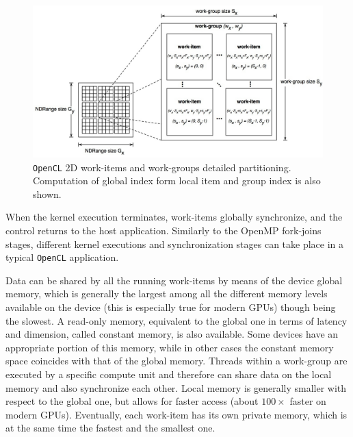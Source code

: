 \begin{description}
        \begin{figure}
    	\centering
    	\includegraphics[width=1.1\textwidth]{./images/parallel_programming/opencl_execmodel2d}
    	\caption{\texttt{OpenCL} 2D work-items and work-groups detailed partitioning. Computation of global index form local item and group index is also shown. }\label{fig:opencl_execmodel2d}
    \end{figure}
    When the kernel execution terminates,
    work-items globally synchronize, and the control returns to the
    host application. Similarly to the OpenMP fork-joins stages,
    different kernel executions and synchronization stages can take
    place in a typical \texttt{OpenCL} application.
    
    Data can be shared by all the running work-items by means of the
    device global memory, which is generally the largest among all the
    different memory levels available on the device (this is especially true for modern GPUs)
    though being the slowest. A read-only memory, equivalent to the
    global one in terms of latency and dimension, called constant
    memory, is also available. Some devices have an appropriate
    portion of this memory, while in other cases the constant memory
    space coincides with that of the global memory. Threads within a
    work-group are executed by a specific compute unit and therefore
    can share data on the local memory and also synchronize each
    other. Local memory is generally smaller with respect to the
    global one, but allows for faster access (about $100\times$ faster
    on modern GPUs). Eventually, each work-item has its own private
    memory, which is at the same time the fastest and the smallest
    one. 
    

\end{description}
